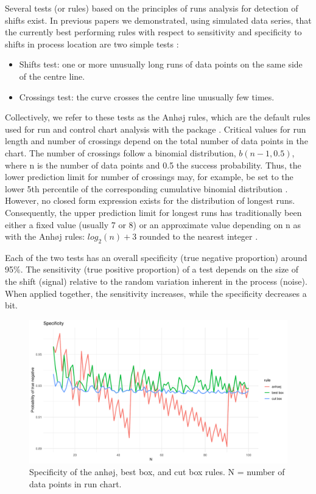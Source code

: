 Several tests (or rules) based on the principles of runs analysis for
detection of shifts exist. In previous papers we demonstrated, using
simulated data series, that the currently best performing rules with
respect to sensitivity and specificity to shifts in process location are
two simple tests \citep{anhoej2014, anhoej2015, anhoej2018}:

\begin{itemize}
\item
  Shifts test: one or more unusually long runs of data points on the
  same side of the centre line.
\item
  Crossings test: the curve crosses the centre line unusually few times.
\end{itemize}

Collectively, we refer to these tests as the Anhøj rules, which are the
default rules used for run and control chart analysis with the
 package \citep{qicharts2}. Critical values for run
length and number of crossings depend on the total number of data points
in the chart. The number of crossings follow a binomial distribution,
\(b(n - 1, 0.5)\), where n is the number of data points and 0.5 the
success probability. Thus, the lower prediction limit for number of
crossings may, for example, be set to the lower 5th percentile of the
corresponding cumulative binomial distribution \citep{chen2010}.
However, no closed form expression exists for the distribution of
longest runs. Consequently, the upper prediction limit for longest runs
has traditionally been either a fixed value (usually 7 or 8)
\citep{carey2002a} or an approximate value depending on n as with the
Anhøj rules: \(log_2(n) + 3\) rounded to the nearest integer
\citep{schilling2012}.

Each of the two tests has an overall specificity (true negative
proportion) around 95\%. The sensitivity (true positive proportion) of a
test depends on the size of the shift (signal) relative to the random
variation inherent in the process (noise). When applied together, the
sensitivity increases, while the specificity decreases a bit.

\begin{figure}[htbp]
  \centering
  \includegraphics[width=\textwidth]{fig_spec.pdf}
  \caption{Specificity of the anhøj, best box, and cut box rules. N = number of data points in run chart. }
  \label{figure:spec}
\end{figure}

